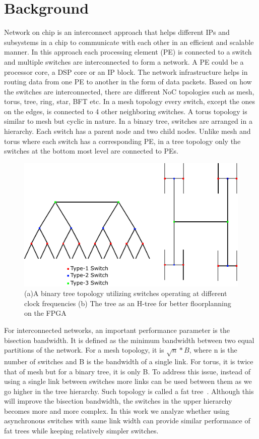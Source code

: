 \section{Background}
\label{sec:background}
Network on chip is an interconnect approach that helps different IPs and subsystems in a chip to communicate with each other in an efficient and scalable manner. 
In this approach each processing element (PE) is connected to a switch and multiple switches are interconnected to form a network.
A PE could be a processor core, a DSP core or an IP block.
The network infrastructure helps in routing data from one PE to another in the form of data packets. 
Based on how the switches are interconnected, there are different NoC topologies such as mesh, torus, tree, ring, star, BFT etc.
In a mesh topology every switch, except the ones on the edges, is connected to 4 other neighboring switches.
A torus topology is similar to mesh but cyclic in nature.
In a binary tree, switches are arranged in a hierarchy.
Each switch has a parent node and two child nodes.
Unlike mesh and torus where each switch has a corresponding PE, in a tree topology only the switches at the bottom most level are connected to PEs.


\begin{figure}[t]
\centering
   \includegraphics[width=\columnwidth]{Figures/HNoC.pdf}
   \caption{(a)A binary tree topology utilizing switches operating at different clock frequencies (b) The tree as an H-tree for better floorplanning on the FPGA}
   \label{fig:btree}
\end{figure}

For interconnected networks, an important performance parameter is the bisection bandwidth.
It is defined as the minimum bandwidth between two equal partitions of the network.
For a mesh topology, it is $\sqrt{n}*B$, where n is the number of switches and B is the bandwidth of a single link.
For torus, it is twice that of mesh but for a binary tree, it is only B.
To address this issue, instead of using a single link between switches more links can be used between them as we go higher in the tree hierarchy.
Such topology is called a fat tree~\cite{Leiserson1985}. 
Although this will improve the bisection bandwidth, the switches in the upper hierarchy becomes more and more complex.
In this work we analyze whether using asynchronous switches with same link width can provide similar performance of fat trees while keeping relatively simpler switches.

